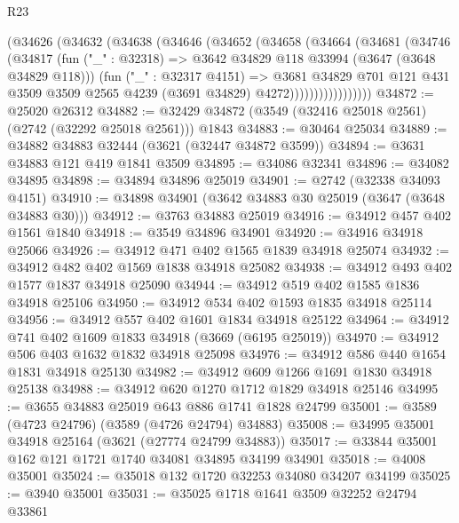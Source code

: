 \begin{lexlean}{R23}
\begin{coremodule}
                (@34626
                  (@34632
                    (@34638
                      (@34646
                        (@34652
                          (@34658
                            (@34664
                              (@34681
                                (@34746
                                  (@34817
                                    (fun ("_" : @32318) =>
                                    @3642 @34829 @118 @33994 (@3647 (@3648 @34829 @118)))
                                    (fun ("_" : @32317 @4151) =>
                                    @3681
                                      @34829
                                      @701
                                      @121
                                      @431
                                      @3509
                                      @3509
                                      @2565
                                      @4239
                                      (@3691 @34829)
                                      @4272)))))))))))))))))
@34872 := @25020 @26312
@34882 := @32429 @34872 (@3549 (@32416 @25018 @2561) (@2742 (@32292 @25018 @2561))) @1843
@34883 := @30464 @25034
@34889 := @34882 @34883 @32444 (@3621 (@32447 @34872 @3599))
@34894 := @3631 @34883 @121 @419 @1841 @3509
@34895 := @34086 @32341
@34896 := @34082 @34895
@34898 := @34894 @34896 @25019
@34901 := @2742 (@32338 @34093 @4151)
@34910 := @34898 @34901 (@3642 @34883 @30 @25019 (@3647 (@3648 @34883 @30)))
@34912 := @3763 @34883 @25019
@34916 := @34912 @457 @402 @1561 @1840
@34918 := @3549 @34896 @34901
@34920 := @34916 @34918 @25066
@34926 := @34912 @471 @402 @1565 @1839 @34918 @25074
@34932 := @34912 @482 @402 @1569 @1838 @34918 @25082
@34938 := @34912 @493 @402 @1577 @1837 @34918 @25090
@34944 := @34912 @519 @402 @1585 @1836 @34918 @25106
@34950 := @34912 @534 @402 @1593 @1835 @34918 @25114
@34956 := @34912 @557 @402 @1601 @1834 @34918 @25122
@34964 := @34912 @741 @402 @1609 @1833 @34918 (@3669 (@6195 @25019))
@34970 := @34912 @506 @403 @1632 @1832 @34918 @25098
@34976 := @34912 @586 @440 @1654 @1831 @34918 @25130
@34982 := @34912 @609 @1266 @1691 @1830 @34918 @25138
@34988 := @34912 @620 @1270 @1712 @1829 @34918 @25146
@34995 := @3655 @34883 @25019 @643 @886 @1741 @1828 @24799
@35001 := @3589 (@4723 @24796) (@3589 (@4726 @24794) @34883)
@35008 := @34995 @35001 @34918 @25164 (@3621 (@27774 @24799 @34883))
@35017 := @33844 @35001 @162 @121 @1721 @1740 @34081 @34895 @34199 @34901
@35018 := @4008 @35001
@35024 := @35018 @132 @1720 @32253 @34080 @34207 @34199
@35025 := @3940 @35001
@35031 := @35025 @1718 @1641 @3509 @32252 @24794 @33861

\end{coremodule}
\end{lexlean}

